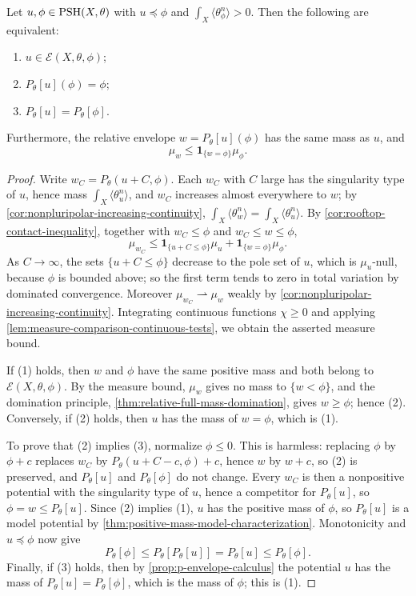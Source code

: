 \begin{proposition}\label{prop:relative-envelope-full-mass-characterization}
Let $u,\phi\in\mathrm{PSH}(X,\theta)$ with $u\preceq\phi$ and $\int_X\langle\theta_\phi^n\rangle>0$. Then the following are equivalent:
\begin{enumerate}
 \item $u\in\mathcal E(X,\theta,\phi)$;
 \item $P_\theta[u](\phi)=\phi$;
 \item $P_\theta[u]=P_\theta[\phi]$.
\end{enumerate}
Furthermore, the relative envelope $w=P_\theta[u](\phi)$ has the same mass as $u$, and
\[
 \mu_w\leq\mathbf1_{\{w=\phi\}}\mu_\phi.
\]
\end{proposition}
\begin{proof}
Write $w_C=P_\theta(u+C,\phi)$. Each $w_C$ with $C$ large has the singularity type of $u$, hence mass $\int_X\langle\theta_u^n\rangle$, and $w_C$ increases almost everywhere to $w$; by \cref{cor:nonpluripolar-increasing-continuity}, $\int_X\langle\theta_w^n\rangle=\int_X\langle\theta_u^n\rangle$. By \cref{cor:rooftop-contact-inequality}, together with $w_C\leq\phi$ and $w_C\leq w\leq\phi$,
\[
 \mu_{w_C}\leq\mathbf1_{\{u+C\leq\phi\}}\mu_u
                  +\mathbf1_{\{w=\phi\}}\mu_\phi.
\]
As $C\to\infty$, the sets $\{u+C\leq\phi\}$ decrease to the pole set of $u$, which is $\mu_u$-null, because $\phi$ is bounded above; so the first term tends to zero in total variation by dominated convergence. Moreover $\mu_{w_C}\rightharpoonup\mu_w$ weakly by \cref{cor:nonpluripolar-increasing-continuity}. Integrating continuous functions $\chi\geq0$ and applying \cref{lem:measure-comparison-continuous-tests}, we obtain the asserted measure bound.

If (1) holds, then $w$ and $\phi$ have the same positive mass and both belong to $\mathcal E(X,\theta,\phi)$. By the measure bound, $\mu_w$ gives no mass to $\{w<\phi\}$, and the domination principle, \cref{thm:relative-full-mass-domination}, gives $w\geq\phi$; hence (2). Conversely, if (2) holds, then $u$ has the mass of $w=\phi$, which is (1).

To prove that (2) implies (3), normalize $\phi\leq0$. This is harmless: replacing $\phi$ by $\phi+c$ replaces $w_C$ by $P_\theta(u+C-c,\phi)+c$, hence $w$ by $w+c$, so (2) is preserved, and $P_\theta[u]$ and $P_\theta[\phi]$ do not change. Every $w_C$ is then a nonpositive potential with the singularity type of $u$, hence a competitor for $P_\theta[u]$, so $\phi=w\leq P_\theta[u]$. Since (2) implies (1), $u$ has the positive mass of $\phi$, so $P_\theta[u]$ is a model potential by \cref{thm:positive-mass-model-characterization}. Monotonicity and $u\preceq\phi$ now give
\[
 P_\theta[\phi]\leq P_\theta[P_\theta[u]]=P_\theta[u]
                              \leq P_\theta[\phi].
\]
Finally, if (3) holds, then by \cref{prop:p-envelope-calculus} the potential $u$ has the mass of $P_\theta[u]=P_\theta[\phi]$, which is the mass of $\phi$; this is (1).
\end{proof}


